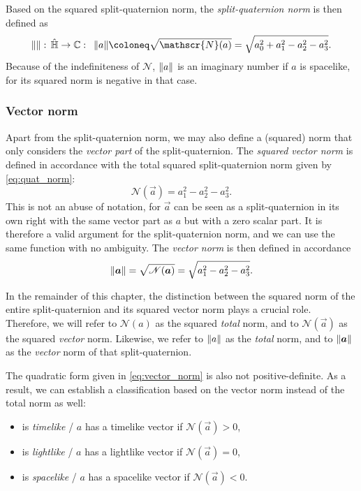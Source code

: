 Based on the squared split-quaternion norm, the \emph{split-quaternion norm} is then defined as
\begin{equation}
     \norm{}:\, \spquaternions \to \complex: \;\: \norm{a} \coloneq \sqrt{\mathscr{N}(a)} = \sqrt{a_0^2 + a_1^2 - a_2^2 - a_3^2}.
\end{equation}
Because of the indefiniteness of $\mathscr{N}$, $\norm{a}$ is an imaginary number if $a$ is spacelike, for its squared norm is negative in that case.

\subsubsection{Vector norm}
Apart from the split-quaternion norm, we may also define a (squared) norm that only considers the \emph{vector part} of the split-quaternion. The \emph{squared vector norm} is defined in accordance with the total squared split-quaternion norm given by \cref{eq:quat_norm}:
\begin{equation}
     \mathscr{N}(\vec{a}) = a_1^2 - a^2_2 - a^2_3.
     \label{eq:vector_norm}
\end{equation}
This is not an abuse of notation, for \(\vec{a}\) can be seen as a split-quaternion in its own right with the same vector part as \(a\) but with a zero scalar part. It is therefore a valid argument for the split-quaternion norm, and we can use the same function with no ambiguity. The \emph{vector norm} is then defined in accordance 
\begin{equation}
    \norm{\vec{a}} = \sqrt{\mathscr{N}(\vec{a})} = \sqrt{a_1^2 - a_2^2 - a_3^2}. 
\end{equation}

In the remainder of this chapter, the distinction between the squared norm of the entire split-quaternion and its squared vector norm plays a crucial role. Therefore, we will refer to \(\mathscr{N}(a)\) as the squared \emph{total} norm, and to \(\mathscr{N}(\vec{a})\) as the squared \emph{vector} norm. Likewise, we refer to $\norm{a}$ as the \emph{total} norm, and to $\norm{\vec{a}}$ as the \emph{vector} norm of that split-quaternion.

The quadratic form given in \cref{eq:vector_norm} is also not positive-definite. As a result, we can establish a classification based on the vector norm instead of the total norm as well:
\begin{itemize}
    \item {} is \emph{timelike} / $a$ has a timelike vector if $\mathscr{N}(\vec{a}) > 0$,
    \item {} is \emph{lightlike} / $a$ has a lightlike vector if $\mathscr{N}(\vec{a}) = 0$,
    \item {} is \emph{spacelike} / $a$ has a spacelike vector if $\mathscr{N}(\vec{a}) < 0$.
\end{itemize}

